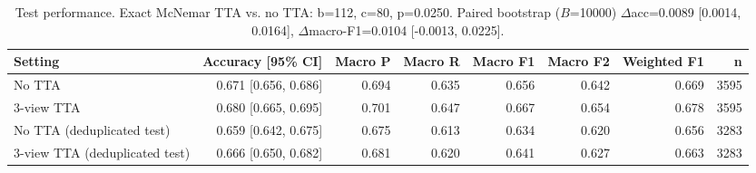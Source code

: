 \begin{table}[ht]
\centering
\small
\caption{Test performance. Exact McNemar TTA vs. no TTA: b=112, c=80, p=0.0250. Paired bootstrap ($B$=10000) $\Delta$acc=0.0089 [0.0014, 0.0164], $\Delta$macro-F1=0.0104 [-0.0013, 0.0225].}
\label{tab:global}
\begin{tabular}{lrrrrrrr}
\toprule
Setting & Accuracy [95\% CI] & Macro P & Macro R & Macro F1 & Macro F2 & Weighted F1 & n \\
\midrule
No TTA & 0.671 [0.656, 0.686] & 0.694 & 0.635 & 0.656 & 0.642 & 0.669 & 3595 \\
3-view TTA & 0.680 [0.665, 0.695] & 0.701 & 0.647 & 0.667 & 0.654 & 0.678 & 3595 \\
No TTA (deduplicated test) & 0.659 [0.642, 0.675] & 0.675 & 0.613 & 0.634 & 0.620 & 0.656 & 3283 \\
3-view TTA (deduplicated test) & 0.666 [0.650, 0.682] & 0.681 & 0.620 & 0.641 & 0.627 & 0.663 & 3283 \\
\bottomrule
\end{tabular}
\end{table}